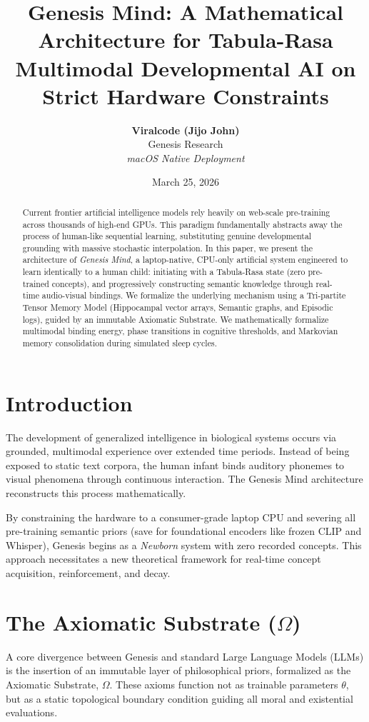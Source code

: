 \documentclass[11pt,twocolumn]{article}
\title{\textbf{Genesis Mind: A Mathematical Architecture for Tabula-Rasa Multimodal Developmental AI on Strict Hardware Constraints}}
\author{
    \textbf{Viralcode (Jijo John)} \\
    Genesis Research \\
    \textit{macOS Native Deployment}
}
\date{March 25, 2026}
\begin{document}
\maketitle

\begin{abstract}
Current frontier artificial intelligence models rely heavily on web-scale pre-training across thousands of high-end GPUs. This paradigm fundamentally abstracts away the process of human-like sequential learning, substituting genuine developmental grounding with massive stochastic interpolation. In this paper, we present the architecture of \textit{Genesis Mind}, a laptop-native, CPU-only artificial system engineered to learn identically to a human child: initiating with a Tabula-Rasa state (zero pre-trained concepts), and progressively constructing semantic knowledge through real-time audio-visual bindings. We formalize the underlying mechanism using a Tri-partite Tensor Memory Model (Hippocampal vector arrays, Semantic graphs, and Episodic logs), guided by an immutable Axiomatic Substrate. We mathematically formalize multimodal binding energy, phase transitions in cognitive thresholds, and Markovian memory consolidation during simulated sleep cycles. 
\end{abstract}

\section{Introduction}
The development of generalized intelligence in biological systems occurs via grounded, multimodal experience over extended time periods. Instead of being exposed to static text corpora, the human infant binds auditory phonemes to visual phenomena through continuous interaction. The Genesis Mind architecture reconstructs this process mathematically.

By constraining the hardware to a consumer-grade laptop CPU and severing all pre-training semantic priors (save for foundational encoders like frozen CLIP \cite{radford2021learning} and Whisper), Genesis begins as a \textit{Newborn} system with zero recorded concepts. This approach necessitates a new theoretical framework for real-time concept acquisition, reinforcement, and decay.

\section{The Axiomatic Substrate ($\Omega$)}
A core divergence between Genesis and standard Large Language Models (LLMs) is the insertion of an immutable layer of philosophical priors, formalized as the Axiomatic Substrate, $\Omega$. These axioms function not as trainable parameters $\theta$, but as a static topological boundary condition guiding all moral and existential evaluations.
\end{document}
